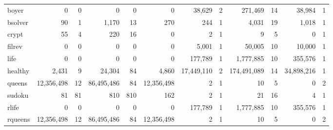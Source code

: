 \documentclass{tlp}
\begin{document}
\begin{table}[tb]
\begin{tabular}{l@{\hspace{0.03cm}}|*{11}{@{\hspace{0.03cm}}r@{\hspace{0.03cm}}|}}
    boyer        & 0          &  0  & 0          &  0  &  0          &   38,629     &   2 &  271,469
  &  14 & 38,984     &  1 \\
    bsolver      & 90         &  1  & 1,170      &  13 &  270        &   244        &   1 &  4,031       &  19 & 1,018      &  1 \\
    crypt        & 55         &  4  & 220        &  16 &  0          &   2          &   1 &  9           &  5  & 0          &  1 \\
    filrev       & 0          &  0  & 0          &  0  &  0          &   5,001      &   1 &  50,005      &  10 & 10,000     &  1 \\
    life         & 0          &  0  & 0          &  0  &  0          &   177,789    &   1 &  1,777,885   &  10 & 355,576    &  1 \\
    healthy      & 2,431      &  9  & 24,304     &  84 &  4,860      &   17,449,110 &   2 &  174,491,089 &  14 &  34,898,216 &  1 \\
    queens       & 12,356,498 &  12 & 86,495,486 &  84 &  12,356,498 &   2          &   1 &  10          &  5  & 0          &  2 \\
    sudoku       & 81         &  81 & 810        &  810&  162        &   2          &   1 &  21          &  16 & 4          &  1 \\
    \hline
    rlife        & 0          &  0  & 0          &  0  &  0          &   177,789    &   1 &  1,777,885   &  10 & 355,576    &  1 \\
    rqueens      & 12,356,498 &  12 & 86,495,486 &  84 &  12,356,498 &   2          &   1 &  10          &  5  & 0          &  2 \\
    \hline
    \hline
  \end{tabular}
  \label{table:experiment:rtsupportrbmm12}
  \normalsize
\end{table}
\end{document}
